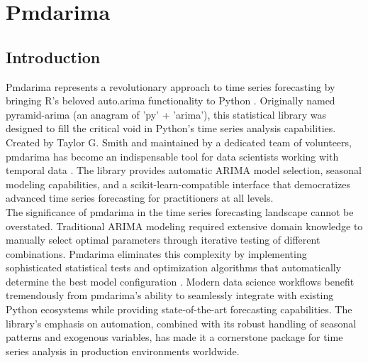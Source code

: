 %
%
%


%
%

\chapter{Pmdarima}
\label{ch:pmdarima}

\section{Introduction}
\label{sec:intro}

Pmdarima represents a revolutionary approach to time series forecasting by bringing R's beloved auto.arima functionality to Python \cite{Pmdarima:2024}. Originally named pyramid-arima (an anagram of 'py' + 'arima'), this statistical library was designed to fill the critical void in Python's time series analysis capabilities. Created by Taylor G. Smith and maintained by a dedicated team of volunteers, pmdarima has become an indispensable tool for data scientists working with temporal data \cite{Smith:2023}. The library provides automatic ARIMA model selection, seasonal modeling capabilities, and a scikit-learn-compatible interface that democratizes advanced time series forecasting for practitioners at all levels.\\

The significance of pmdarima in the time series forecasting landscape cannot be overstated. Traditional ARIMA modeling required extensive domain knowledge to manually select optimal parameters through iterative testing of different combinations. Pmdarima eliminates this complexity by implementing sophisticated statistical tests and optimization algorithms that automatically determine the best model configuration \cite{HyndmanKhandakar:2008}. Modern data science workflows benefit tremendously from pmdarima's ability to seamlessly integrate with existing Python ecosystems while providing state-of-the-art forecasting capabilities. The library's emphasis on automation, combined with its robust handling of seasonal patterns and exogenous variables, has made it a cornerstone package for time series analysis in production environments worldwide.\\

